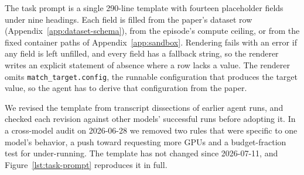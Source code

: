 The task prompt is a single 290-line template with fourteen placeholder fields
under nine headings. Each field is filled from the paper's dataset row
(Appendix~\ref{app:dataset-schema}), from the episode's compute ceiling, or
from the fixed container paths of Appendix~\ref{app:sandbox}. Rendering fails
with an error if any field is left unfilled, and every field has a fallback
string, so the renderer writes an explicit statement of absence where a row
lacks a value. The renderer omits \texttt{match\_target.config}, the runnable
configuration that produces the target value, so the agent has to derive that
configuration from the paper.

We revised the template from transcript dissections of earlier agent runs,
and checked each revision against other models' successful runs before
adopting it. In a cross-model audit on 2026-06-28 we removed two rules that
were specific to one model's behavior, a push toward requesting more GPUs and
a budget-fraction test for under-running. The template has not changed since 2026-07-11, and
Figure~\ref{lst:task-prompt} reproduces it in full.

